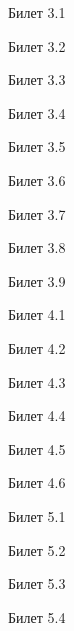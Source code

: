 \documentclass[a4paper,12pt]{article}
\begin{document}
\newpage
\begin{mybox}{\hypertarget{bil3_1}{Билет 3.1}}
\end{mybox}
\newpage
\begin{mybox}{\hypertarget{bil3_2}{Билет 3.2}}
\end{mybox}
\newpage
\begin{mybox}{\hypertarget{bil3_3}{Билет 3.3}}
\end{mybox}
\newpage
\begin{mybox}{\hypertarget{bil3_4}{Билет 3.4}}
\end{mybox}
\newpage
\begin{mybox}{\hypertarget{bil3_5}{Билет 3.5}}
\end{mybox}
\newpage
\begin{mybox}{\hypertarget{bil3_6}{Билет 3.6}}
\end{mybox}
\newpage
\begin{mybox}{\hypertarget{bil3_7}{Билет 3.7}}
\end{mybox}
\newpage
\begin{mybox}{\hypertarget{bil3_8}{Билет 3.8}}
\end{mybox}
\newpage
\begin{mybox}{\hypertarget{bil3_9}{Билет 3.9}}
\end{mybox}
\newpage
\begin{mybox}{\hypertarget{bil4_1}{Билет 4.1}}
\end{mybox}
\newpage
\begin{mybox}{\hypertarget{bil4_2}{Билет 4.2}}
\end{mybox}
\newpage
\begin{mybox}{\hypertarget{bil4_3}{Билет 4.3}}
\end{mybox}
\newpage
\begin{mybox}{\hypertarget{bil4_4}{Билет 4.4}}
\end{mybox}
\newpage
\begin{mybox}{\hypertarget{bil4_5}{Билет 4.5}}
\end{mybox}
\newpage
\begin{mybox}{\hypertarget{bil4_6}{Билет 4.6}}
\end{mybox}


\newpage
\begin{mybox}{\hypertarget{bil5_1}{Билет 5.1}}
\end{mybox}
\newpage
\begin{mybox}{\hypertarget{bil5_2}{Билет 5.2}}
\end{mybox}
\newpage
\begin{mybox}{\hypertarget{bil5_3}{Билет 5.3}}
\end{mybox}
\newpage
\begin{mybox}{\hypertarget{bil5_4}{Билет 5.4}}
\end{mybox}
\end{document}
